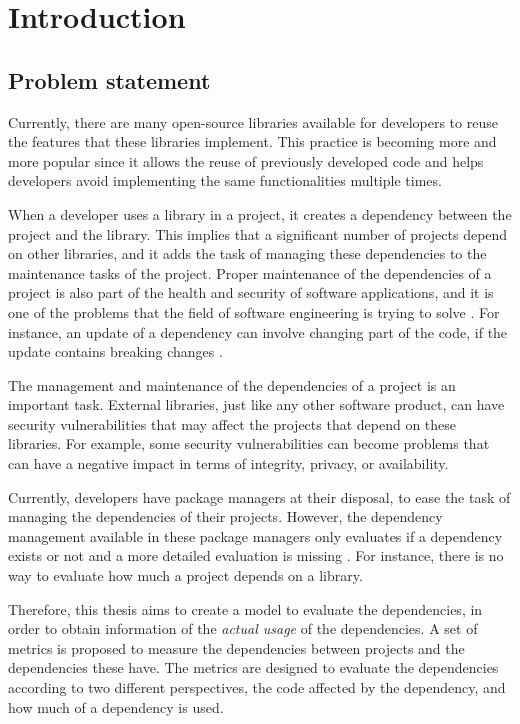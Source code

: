 \chapter{Introduction}\label{ch:Introduction}

\section{Problem statement}
Currently, there are many open-source libraries available for developers to reuse the features that these libraries implement. This practice is becoming more and more popular since it allows the reuse of previously developed code and helps developers avoid implementing the same functionalities multiple times.

When a developer uses a library in a project, it creates a dependency between the project and the library. This implies that a significant number of projects depend on other libraries, and it adds the task of managing these dependencies to the maintenance tasks of the project. Proper maintenance of the dependencies of a project is also part of the health and security of software applications, and it is one of the problems that the field of software engineering is trying to solve \cite{kula2014visualizing}. For instance, an update of a dependency can involve changing part of the code, if the update contains breaking changes \cite{Raemaekers2017}.

The management and maintenance of the dependencies of a project is an important task. External libraries, just like any other software product, can have security vulnerabilities that may affect the projects that depend on these libraries. For example, some security vulnerabilities can become problems that can have a negative impact in terms of integrity, privacy, or availability.

\blankl
Currently, developers have package managers at their disposal, to ease the task of managing the dependencies of their projects. However, the dependency management available in these package managers only evaluates if a dependency exists or not and a more detailed evaluation is missing \cite{hejderup2018prazi}. For instance, there is no way to evaluate how much a project depends on a library.

\blankl
Therefore, this thesis aims to create a model to evaluate the dependencies, in order to obtain information of the \textit{actual usage} of the dependencies. A set of metrics is proposed to measure the dependencies between projects and the dependencies these have. The metrics are designed to evaluate the dependencies according to two different perspectives, the code affected by the dependency, and how much of a dependency is used.

